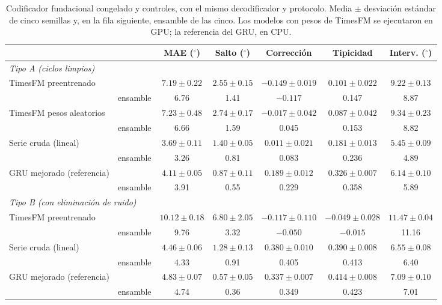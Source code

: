 \documentclass[11pt,a4paper]{amsart}
\newcommand{\gr}{$^{\circ}$}
\begin{document}
\begin{table}[h]
\centering\footnotesize
\setlength{\tabcolsep}{2.5pt}
\begin{tabular}{llccccc}
\toprule
 & & MAE (\gr) & Salto (\gr) & Corrección & Tipicidad & Interv. (\gr) \\
\midrule
\multicolumn{7}{l}{\textit{Tipo A (ciclos limpios)}}\\
TimesFM preentrenado & & $7.19\pm0.22$ & $2.55\pm0.15$ & $-0.149\pm0.019$ & $0.101\pm0.022$ & $9.22\pm0.13$ \\
 & ensamble & 6.76 & 1.41 & $-0.117$ & 0.147 & 8.87 \\
TimesFM pesos aleatorios & & $7.23\pm0.48$ & $2.74\pm0.17$ & $-0.017\pm0.042$ & $0.087\pm0.042$ & $9.34\pm0.23$ \\
 & ensamble & 6.66 & 1.59 & 0.045 & 0.153 & 8.82 \\
Serie cruda (lineal) & & $3.69\pm0.11$ & $1.40\pm0.05$ & $0.011\pm0.021$ & $0.181\pm0.013$ & $5.45\pm0.09$ \\
 & ensamble & 3.26 & 0.81 & 0.083 & 0.236 & 4.89 \\
GRU mejorado (referencia) & & $4.11\pm0.05$ & $0.87\pm0.11$ & $0.189\pm0.012$ & $0.326\pm0.007$ & $6.14\pm0.10$ \\
 & ensamble & 3.91 & 0.55 & 0.229 & 0.358 & 5.89 \\
\midrule
\multicolumn{7}{l}{\textit{Tipo B (con eliminación de ruido)}}\\
TimesFM preentrenado & & $10.12\pm0.18$ & $6.80\pm2.05$ & $-0.117\pm0.110$ & $-0.049\pm0.028$ & $11.47\pm0.04$ \\
 & ensamble & 9.76 & 3.32 & $-0.050$ & $-0.015$ & 11.16 \\
Serie cruda (lineal) & & $4.46\pm0.06$ & $1.28\pm0.13$ & $0.380\pm0.010$ & $0.390\pm0.008$ & $6.55\pm0.08$ \\
 & ensamble & 4.33 & 0.91 & 0.405 & 0.413 & 6.40 \\
GRU mejorado (referencia) & & $4.83\pm0.07$ & $0.57\pm0.05$ & $0.337\pm0.007$ & $0.414\pm0.008$ & $7.09\pm0.10$ \\
 & ensamble & 4.74 & 0.36 & 0.349 & 0.423 & 7.01 \\
\bottomrule
\end{tabular}
\caption{Codificador fundacional congelado y controles, con el mismo decodificador y protocolo. Media $\pm$ desviación estándar de cinco semillas y, en la fila siguiente, ensamble de las cinco. Los modelos con pesos de TimesFM se ejecutaron en GPU; la referencia del GRU, en CPU.}
\label{tab:fm}
\end{table}
\end{document}
